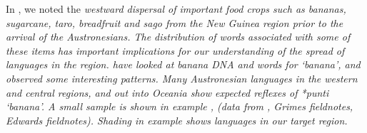 In , we noted the \it{westward} dispersal of important
food crops such as bananas,
sugarcane, taro, breadfruit and sago from the New Guinea region
prior to the arrival of the Austronesians.
The distribution of words associated with some of these items
has important implications for our understanding of the spread
of languages in the region.
\citet{DenhamDonohue2009} have looked at banana DNA
and words for ‘banana’,
and observed some interesting patterns.
Many Austronesian languages in the western
and central regions, and out into Oceania show expected reflexes
of  *punti ‘banana’.
A small sample is shown in example ,
(data from \citealt{BlustTrussel2020}, Grimes fieldnotes, Edwards fieldnotes).
Shading in example  shows languages in our target region.

